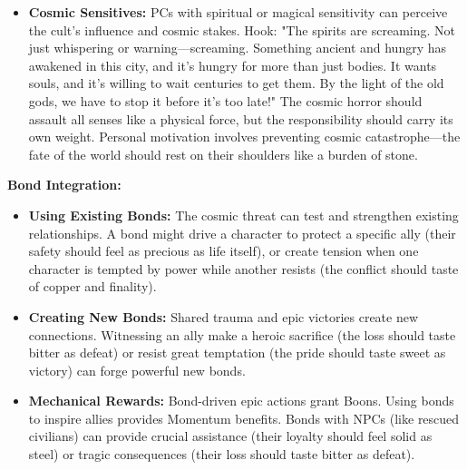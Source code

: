 \documentclass[11pt]{article}
\begin{document}
\begin{itemize}
\item \textbf{Cosmic Sensitives:} PCs with spiritual or magical sensitivity can perceive the cult's influence and cosmic stakes. Hook: "The spirits are screaming. Not just whispering or warning—screaming. Something ancient and hungry has awakened in this city, and it's hungry for more than just bodies. It wants souls, and it's willing to wait centuries to get them. By the light of the old gods, we have to stop it before it's too late!" The cosmic horror should assault all senses like a physical force, but the responsibility should carry its own weight. Personal motivation involves preventing cosmic catastrophe—the fate of the world should rest on their shoulders like a burden of stone.
\end{itemize}

\textbf{Bond Integration:}
\begin{itemize}
\item \textbf{Using Existing Bonds:} The cosmic threat can test and strengthen existing relationships. A bond might drive a character to protect a specific ally (their safety should feel as precious as life itself), or create tension when one character is tempted by power while another resists (the conflict should taste of copper and finality).
\item \textbf{Creating New Bonds:} Shared trauma and epic victories create new connections. Witnessing an ally make a heroic sacrifice (the loss should taste bitter as defeat) or resist great temptation (the pride should taste sweet as victory) can forge powerful new bonds.
\item \textbf{Mechanical Rewards:} Bond-driven epic actions grant Boons. Using bonds to inspire allies provides Momentum benefits. Bonds with NPCs (like rescued civilians) can provide crucial assistance (their loyalty should feel solid as steel) or tragic consequences (their loss should taste bitter as defeat).
\end{itemize}
\end{document}
